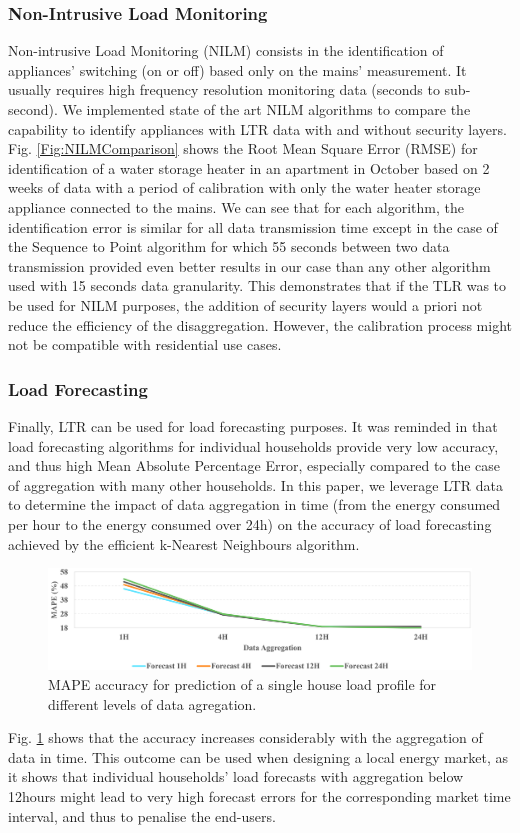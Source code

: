 \documentclass[conference]{IEEEtran}
\begin{document}
\subsubsection{Non-Intrusive Load Monitoring}
\label{section:NILM}
Non-intrusive Load Monitoring (NILM) consists in the identification of appliances' switching (on or off) based only on the mains' measurement. It usually requires high frequency resolution monitoring data (seconds to sub-second). We implemented state of the art NILM algorithms to compare the capability to identify appliances with LTR data with and without security layers.  Fig. \ref{Fig:NILMComparison} shows the Root Mean Square Error (RMSE) for identification of a water storage heater in an apartment in October based on 2 weeks of data with a period of calibration with only the water heater storage appliance connected to the mains.  We can see that for each algorithm, the identification error is similar for all data transmission time except in the case of the Sequence to Point algorithm for which 55 seconds between two data transmission provided even better results in our case than any other algorithm used with 15 seconds data granularity. This demonstrates that if the TLR was to be used for NILM purposes, the addition of security layers would a priori not reduce the efficiency of the disaggregation. However, the calibration process might not be compatible with residential use cases.

\subsubsection{Load Forecasting}
Finally, LTR can be used for load forecasting purposes. It was reminded in \cite{IEEE:ReviewSmartMeterData} that load forecasting algorithms for individual households provide very low accuracy, and thus high Mean Absolute Percentage Error, especially compared to the case of aggregation with many other households. In this paper, we leverage LTR data to determine the impact of data aggregation in time (from the energy consumed per hour to the energy consumed over 24h) on the accuracy of load forecasting achieved by the efficient k-Nearest Neighbours algorithm.

\begin{figure}[h]
	\centering
	\includegraphics[width=1\columnwidth]{Images/ForecastAccuracy.png}
	\caption{MAPE accuracy for prediction of a single house load profile for different levels of data agregation.}
	\label{Fig:ForecastAccuracy}
\end{figure}
 Fig. \ref{Fig:ForecastAccuracy} shows that the accuracy increases considerably with the aggregation of data in time. This outcome can be used when designing a local energy market, as it shows that individual households' load forecasts with aggregation below 12hours might lead to very high forecast errors for the corresponding market time interval, and thus to penalise the end-users.
\end{document}
